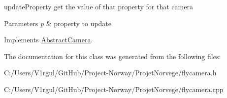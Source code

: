 update\-Property get the value of that property for that camera 


\begin{DoxyParams}{Parameters}
{\em p} & property to update \\
\hline
\end{DoxyParams}


Implements \hyperlink{class_abstract_camera_acb48ab701cd02e78604a3ca1c695b1cf}{Abstract\-Camera}.



The documentation for this class was generated from the following files\-:\begin{DoxyCompactItemize}
\item 
C\-:/\-Users/\-V1rgul/\-Git\-Hub/\-Project-\/\-Norway/\-Projet\-Norvege/flycamera.\-h\item 
C\-:/\-Users/\-V1rgul/\-Git\-Hub/\-Project-\/\-Norway/\-Projet\-Norvege/flycamera.\-cpp\end{DoxyCompactItemize}

